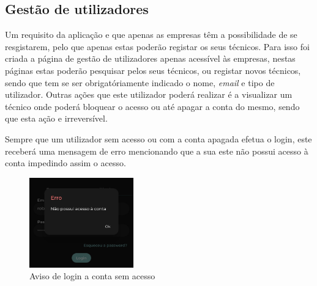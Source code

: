 \subsection{Gestão de utilizadores}
Um requisito da aplicação e que apenas as empresas têm a possibilidade de se resgistarem, pelo que apenas estas poderão registar os seus técnicos. Para isso foi criada a página de gestão de utilizadores apenas acessível às empresas, nestas páginas estas poderão pesquisar pelos seus técnicos, ou registar novos técnicos, sendo que tem se ser obrigatóriamente indicado o nome, \textit{email} e tipo de utilizador. Outras ações que este utilizador poderá realizar é a visualizar um técnico onde poderá bloquear o acesso ou até apagar a conta do mesmo, sendo que esta ação e irreversível.


\begin{figure}[htb]%
  \centering
  \qquad
  \label{fig:70}%
\end{figure}

Sempre que um utilizador sem acesso ou com a conta apagada efetua o login, este receberá uma mensagem de erro mencionando que a sua este não possui acesso à conta impedindo assim o acesso.

\begin{figure}[htb]
  \centering
  \includegraphics[width=0.4\textwidth]{images/implementacao/frontend/gestao_users/1686054218243.jpg}
  \caption{Aviso de login a conta sem acesso}
  \label{fig:71}
\end{figure}